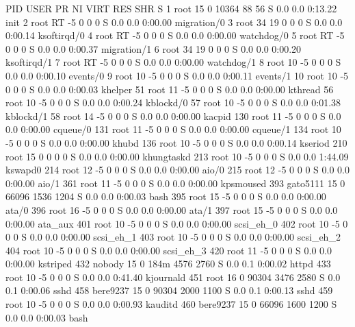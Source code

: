 \documentclass[12pt]{book}
\newenvironment{code}{ \verbatimtab  }{ \endverbatimtab }
\begin{document}
\begin{code}
  PID USER      PR  NI  VIRT  RES  SHR S %
    1 root      15   0 10364   88   56 S  0.0  0.0   0:13.22 init
    2 root      RT  -5     0    0    0 S  0.0  0.0   0:00.00 migration/0
    3 root      34  19     0    0    0 S  0.0  0.0   0:00.14 ksoftirqd/0
    4 root      RT  -5     0    0    0 S  0.0  0.0   0:00.00 watchdog/0
    5 root      RT  -5     0    0    0 S  0.0  0.0   0:00.37 migration/1
    6 root      34  19     0    0    0 S  0.0  0.0   0:00.20 ksoftirqd/1
    7 root      RT  -5     0    0    0 S  0.0  0.0   0:00.00 watchdog/1
    8 root      10  -5     0    0    0 S  0.0  0.0   0:00.10 events/0
    9 root      10  -5     0    0    0 S  0.0  0.0   0:00.11 events/1
   10 root      10  -5     0    0    0 S  0.0  0.0   0:00.03 khelper
   51 root      11  -5     0    0    0 S  0.0  0.0   0:00.00 kthread
   56 root      10  -5     0    0    0 S  0.0  0.0   0:00.24 kblockd/0
   57 root      10  -5     0    0    0 S  0.0  0.0   0:01.38 kblockd/1
   58 root      14  -5     0    0    0 S  0.0  0.0   0:00.00 kacpid
  130 root      11  -5     0    0    0 S  0.0  0.0   0:00.00 cqueue/0
  131 root      11  -5     0    0    0 S  0.0  0.0   0:00.00 cqueue/1
  134 root      10  -5     0    0    0 S  0.0  0.0   0:00.00 khubd
  136 root      10  -5     0    0    0 S  0.0  0.0   0:00.14 kseriod
  210 root      15   0     0    0    0 S  0.0  0.0   0:00.00 khungtaskd
  213 root      10  -5     0    0    0 S  0.0  0.0   1:44.09 kswapd0
  214 root      12  -5     0    0    0 S  0.0  0.0   0:00.00 aio/0
  215 root      12  -5     0    0    0 S  0.0  0.0   0:00.00 aio/1
  361 root      11  -5     0    0    0 S  0.0  0.0   0:00.00 kpsmoused
  393 gato5111  15   0 66096 1536 1204 S  0.0  0.0   0:00.03 bash
  395 root      15  -5     0    0    0 S  0.0  0.0   0:00.00 ata/0
  396 root      16  -5     0    0    0 S  0.0  0.0   0:00.00 ata/1
  397 root      15  -5     0    0    0 S  0.0  0.0   0:00.00 ata_aux
  401 root      10  -5     0    0    0 S  0.0  0.0   0:00.00 scsi_eh_0
  402 root      10  -5     0    0    0 S  0.0  0.0   0:00.00 scsi_eh_1
  403 root      10  -5     0    0    0 S  0.0  0.0   0:00.00 scsi_eh_2
  404 root      10  -5     0    0    0 S  0.0  0.0   0:00.00 scsi_eh_3
  420 root      11  -5     0    0    0 S  0.0  0.0   0:00.00 kstriped
  432 nobody    15   0  184m 4576 2760 S  0.0  0.1   0:00.02 httpd
  433 root      10  -5     0    0    0 S  0.0  0.0   0:41.40 kjournald
  451 root      16   0 90304 3476 2580 S  0.0  0.1   0:00.06 sshd
  458 bere9237  15   0 90304 2000 1100 S  0.0  0.1   0:00.13 sshd
  459 root      10  -5     0    0    0 S  0.0  0.0   0:00.93 kauditd
  460 bere9237  15   0 66096 1600 1200 S  0.0  0.0   0:00.03 bash
\end{code}
\end{document}
